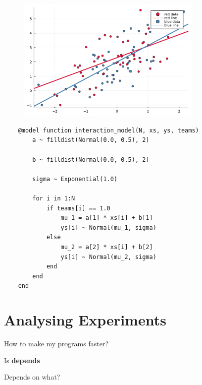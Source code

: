 \documentclass[aspectratio=169,xcolor=svgnames]{beamer}
\begin{document}
\begin{frame}
  \begin{figure}[ht]
    \centering
    \includegraphics[width=0.8\textwidth]{figures/plot_interaction.pdf}
  \end{figure}
\end{frame}

\begin{frame}[fragile]
  \begin{verbatim}
    @model function interaction_model(N, xs, ys, teams)
        a ~ filldist(Normal(0.0, 0.5), 2)

        b ~ filldist(Normal(0.0, 0.5), 2)

        sigma ~ Exponential(1.0)

        for i in 1:N
            if teams[i] == 1.0
                mu_1 = a[1] * xs[i] + b[1]
                ys[i] ~ Normal(mu_1, sigma)
            else
                mu_2 = a[2] * xs[i] + b[2]
                ys[i] ~ Normal(mu_2, sigma)
            end
        end
    end
  \end{verbatim}
\end{frame}

\section{Analysing Experiments}

\begin{frame}
  How to make my programs faster?

  \pause
  Is \textbf{depends}

  \pause
  Depends on what?
\end{frame}

\begin{frame}
  \center
\end{frame}
\end{document}
